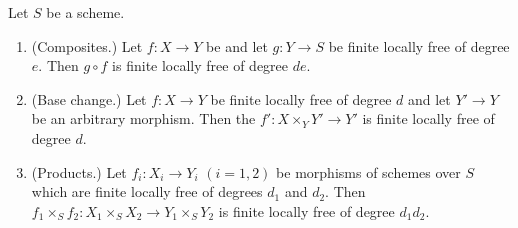 \begin{lemma}
\label{lem:pc-flf-degree-multiplicative}
Let $S$ be a scheme.
\begin{enumerate}
\item (Composites.)  Let $f:X\to Y$ be
   and let $g:Y\to S$ be finite locally free of degree $e$.  Then
  $g\circ f$ is finite locally free of degree $de$.
\item (Base change.)  Let $f:X\to Y$ be finite locally free of degree
  $d$ and let $Y'\to Y$ be an arbitrary morphism.  Then the
  $f':X\times_YY'\to Y'$ is finite locally free of degree $d$.
\item (Products.)  Let $f_i:X_i\to Y_i$ $(i=1,2)$ be morphisms of
  schemes over $S$ which are finite locally free of degrees $d_1$ and
  $d_2$.  Then
  $f_1\times_Sf_2:X_1\times_SX_2\to Y_1\times_SY_2$ is finite locally
  free of degree $d_1d_2$.
\end{enumerate}
\end{lemma}
